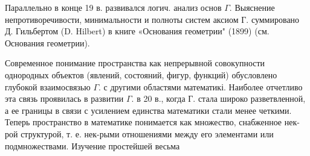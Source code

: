 \documentclass[10pt]{article}
\begin{document}
Параллельно в конце 19 в. развивался логич. анализ основ $\Gamma$. Выяснение непротиворечивости, минимальности и полноты систем аксиом Г. суммировано Д. Гильбертом (D. Hilbert) в книге «Основания геометрии" (1899) (см. Основания геометрии).



Современное понимание пространства как непрерывной совокупности однородных объектов (явлений, состояний, фигур, функций) обусловлено глубокой взаимосвязью $\Gamma$. с другими областями математикі. Наиболее отчетливо эта связь проявилась в развитии $\Gamma$. в 20 в., когда Г. стала широко разветвленной, а ее границы в связи с усилением единства математики стали менее четкими. Теперь пространство в математике понимается как множество, снабженное нек-рой структурой, т. е. нек-рыми отношениями между его элементами или подмножествами. Изучение простейшей весьма
\end{document}
